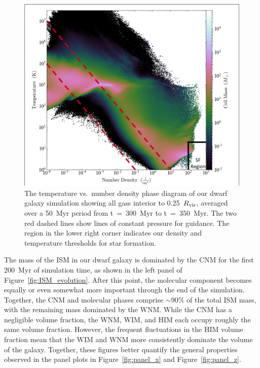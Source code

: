 \documentclass[twocolumn]{aastex61}
\begin{document}
\begin{figure}
\centering
\includegraphics[width=0.95\linewidth]{phase_diagram.png}
\caption{The temperature vs.\ number density phase diagram of our dwarf galaxy simulation showing all gass interior to 0.25~$R_{\rm vir}$, averaged over a 50~Myr period from t~=~300~Myr to t~=~350~Myr. The two red dashed lines show lines of constant pressure for guidance. The region in the lower right corner indicates our density and temperature thresholds for star formation.}
\label{fig:phase}
\end{figure} 

The mass of the ISM in our dwarf galaxy is dominated by the CNM for the first 200~Myr of simulation time, as shown in the left panel of Figure~\ref{fig:ISM_evolution}. After this point, the molecular component becomes equally or even somewhat more important through the end of the simulation. Together, the CNM and molecular phases comprise $\sim 90\%$ of the total ISM mass, with the remaining mass dominated by the WNM. While the CNM has a negligible volume fraction, the WNM, WIM, and HIM each occupy roughly the same volume fraction. However, the frequent fluctuations in the HIM volume fraction mean that the WIM and WNM more consistently dominate the volume of the galaxy. Together, these figures better quantify the general properties observed in the panel plots in Figure~\ref{fig:panel_x} and Figure~\ref{fig:panel_z}. 
\end{document}
